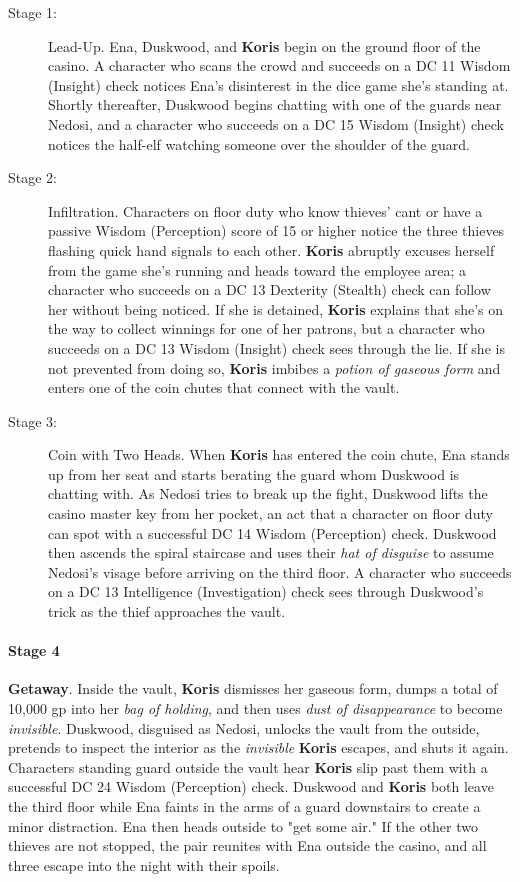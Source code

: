 \documentclass[letterpaper, 11pt, bg=full, twocolumn]{dndbook}
\begin{document}
\begin{description}
\item[Stage 1:] Lead-Up. Ena, Duskwood, and \textbf{Koris} begin on the ground floor of the casino. A character who scans the crowd and succeeds on a DC 11 Wisdom (Insight) check notices Ena's disinterest in the dice game she's standing at. Shortly thereafter, Duskwood begins chatting with one of the guards near Nedosi, and a character who succeeds on a DC 15 Wisdom (Insight) check notices the half-elf watching someone over the shoulder of the guard.
\item[Stage 2:] Infiltration. Characters on floor duty who know thieves' cant or have a passive Wisdom (Perception) score of 15 or higher notice the three thieves flashing quick hand signals to each other. \textbf{Koris} abruptly excuses herself from the game she's running and heads toward the employee area; a character who succeeds on a DC 13 Dexterity (Stealth) check can follow her without being noticed. If she is detained, \textbf{Koris} explains that she's on the way to collect winnings for one of her patrons, but a character who succeeds on a DC 13 Wisdom (Insight) check sees through the lie. If she is not prevented from doing so, \textbf{Koris} imbibes a \textit{potion of gaseous form} and enters one of the coin chutes that connect with the vault.
\item[Stage 3:] Coin with Two Heads. When \textbf{Koris} has entered the coin chute, Ena stands up from her seat and starts berating the guard whom Duskwood is chatting with. As Nedosi tries to break up the fight, Duskwood lifts the casino master key from her pocket, an act that a character on floor duty can spot with a successful DC 14 Wisdom (Perception) check. Duskwood then ascends the spiral staircase and uses their \textit{hat of disguise} to assume Nedosi's visage before arriving on the third floor. A character who succeeds on a DC 13 Intelligence (Investigation) check sees through Duskwood's trick as the thief approaches the vault.
\end{description}

\paragraph{Stage 4}

\textbf{Getaway}. Inside the vault, \textbf{Koris} dismisses her gaseous form, dumps a total of 10,000 gp into her \textit{bag of holding}, and then uses \textit{dust of disappearance} to become \textit{invisible}. Duskwood, disguised as Nedosi, unlocks the vault from the outside, pretends to inspect the interior as the \textit{invisible} \textbf{Koris} escapes, and shuts it again. Characters standing guard outside the vault hear \textbf{Koris} slip past them with a successful DC 24 Wisdom (Perception) check. Duskwood and \textbf{Koris} both leave the third floor while Ena faints in the arms of a guard downstairs to create a minor distraction. Ena then heads outside to "get some air." If the other two thieves are not stopped, the pair reunites with Ena outside the casino, and all three escape into the night with their spoils.
\end{document}
